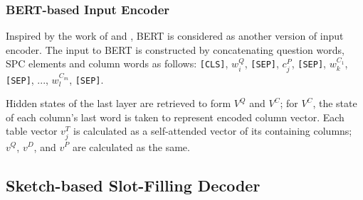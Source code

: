 \documentclass[11pt,a4paper]{article}
\begin{document}
\subsubsection{BERT-based Input Encoder}
Inspired by the work of \citet{sqlova} and \citet{irnet}, BERT \citep{Devlin:19} is considered as another version of input encoder. The input to BERT is constructed by concatenating question words, SPC elements and column words as follows: \texttt{[CLS]}, $w^Q_i$, \texttt{[SEP]}, $c^P_j$, \texttt{[SEP]}, $w^{C_1}_k$, \texttt{[SEP]}, ..., $w^{C_m}_l$, \texttt{[SEP]}. 

Hidden states of the last layer are retrieved to form $V^Q$ and $V^C$; for $V^C$, the state of each column's last word is taken to represent encoded column vector. Each table vector $v^T_j$ is calculated as a self-attended vector of its containing columns; $v^Q$, $v^D$, and $v^P$ are calculated as the same.

\subsection{Sketch-based Slot-Filling Decoder} 
\label{subsec:decoder}
\end{document}
